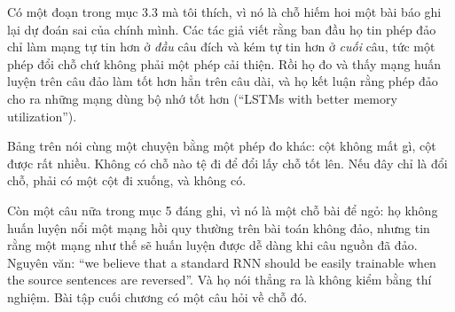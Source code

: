 %
Có một đoạn trong mục 3.3 mà tôi thích, vì nó là chỗ hiếm hoi một bài báo ghi
lại dự đoán sai của chính mình. Các tác giả viết rằng ban đầu họ tin phép đảo
chỉ làm mạng tự tin hơn ở \emph{đầu} câu đích và kém tự tin hơn ở
\emph{cuối} câu, tức một phép đổi chỗ chứ không phải một phép cải thiện. Rồi họ
đo và thấy mạng huấn luyện trên câu đảo làm tốt hơn hẳn trên câu dài, và họ kết
luận rằng phép đảo cho ra những mạng dùng bộ nhớ tốt hơn
(\enquote{LSTMs with better memory utilization}).

Bảng trên nói cùng một chuyện bằng một phép đo khác: cột  không mất
gì, cột  được rất nhiều. Không có chỗ nào tệ đi để đổi lấy chỗ tốt
lên. Nếu đây chỉ là đổi chỗ, phải có một cột đi xuống, và không có.

Còn một câu nữa trong mục 5 đáng ghi, vì nó là một chỗ bài để ngỏ: họ không
huấn luyện nổi một mạng hồi quy thường trên bài toán không đảo, nhưng tin rằng
một mạng như thế sẽ huấn luyện được dễ dàng khi câu nguồn đã đảo. Nguyên văn:
\enquote{we believe that a standard RNN should be easily trainable when the
source sentences are reversed}. Và họ nói thẳng ra là không kiểm bằng thí
nghiệm. Bài tập cuối chương có một câu hỏi về chỗ đó.
